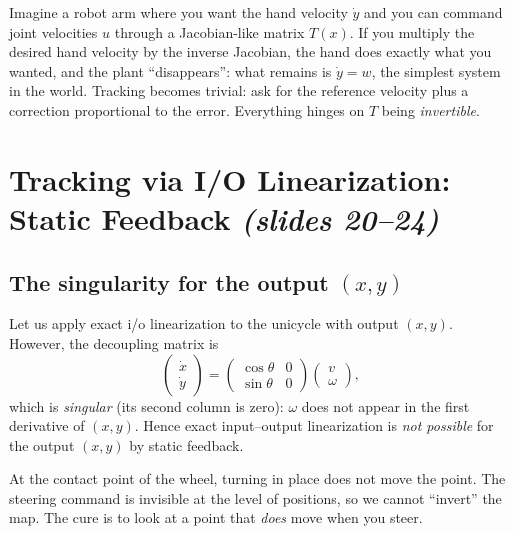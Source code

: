\documentclass[11pt,a4paper]{article}
\def\bm#1{#1}%
\def\vect#1{#1}%
\newcommand{\vect}[1]{\bm{#1}}
\theoremstyle{definition}
\theoremstyle{plain}
\theoremstyle{remark}
\begin{document}
\begin{intuition}
Imagine a robot arm where you want the hand velocity $\dot{\vect y}$ and you can command joint velocities $\vect u$ through a Jacobian-like matrix $\vect T(\vect x)$. If you multiply the desired hand velocity by the inverse Jacobian, the hand does exactly what you wanted, and the plant ``disappears'': what remains is $\dot y=w$, the simplest system in the world. Tracking becomes trivial: ask for the reference velocity plus a correction proportional to the error. Everything hinges on $\vect T$ being \emph{invertible}.
\end{intuition}

\section{Tracking via I/O Linearization: Static Feedback \texorpdfstring{\emph{(slides 20--24)}}{(slides 20--24)}}

\subsection{The singularity for the output $(x,y)$}

Let us apply exact i/o linearization to the unicycle with output $(x,y)$. However, the decoupling matrix is
\[
\begin{pmatrix}\dot x\\\dot y\end{pmatrix}=\begin{pmatrix}\cos\theta&0\\\sin\theta&0\end{pmatrix}\begin{pmatrix}v\\\omega\end{pmatrix},
\]
which is \emph{singular} (its second column is zero): $\omega$ does not appear in the first derivative of $(x,y)$. Hence exact input--output linearization is \emph{not possible} for the output $(x,y)$ by static feedback.

\begin{intuition}
At the contact point of the wheel, turning in place does not move the point. The steering command is invisible at the level of positions, so we cannot ``invert'' the map. The cure is to look at a point that \emph{does} move when you steer.
\end{intuition}
\end{document}

